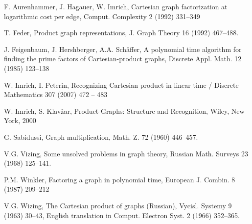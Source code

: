 \documentclass[12pt,a4paper,titlepage]{article}
\begin{document}
\newpage
\begin{thebibliography}{99}
 F. Aurenhammer, J. Hagauer, W. Imrich, 
Cartesian graph factorization at logarithmic cost per edge, Comput. Complexity 2 (1992) 331–349

 T. Feder, 
Product graph representations, J. Graph Theory 16 (1992) 467–488.

 J. Feigenbaum, J. Hershberger, A.A. Schäffer, 
A polynomial time algorithm for finding the prime factors of Cartesian-product graphs, Discrete Appl. Math. 12 (1985) 123–138

 W. Imrich, I. Peterin, 
Recognizing Cartesian product in linear time / Discrete Mathematics 307 (2007) 472 – 483

 W. Imrich, S. Klavžar, 
Product Graphs: Structure and Recognition, Wiley, New York, 2000

 G. Sabidussi,
Graph multiplication, Math. Z. 72 (1960) 446–457.

 V.G. Vizing, 
Some unsolved problems in graph theory, Russian Math. Surveys 23 (1968) 125–141.

 P.M. Winkler, 
Factoring a graph in polynomial time, European J. Combin. 8 (1987) 209–212

 V.G. Wizing,
The Cartesian product of graphs (Russian), Vycisl. Systemy 9 (1963) 30–43, English translation in Comput. Electron Syst. 2 (1966) 352–365.
\end{thebibliography}
\end{document}
